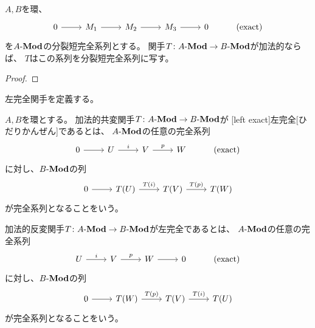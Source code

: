 \documentclass[report]{jlreq}
\begin{document}
\begin{theorem}[加法的関手は分裂短完全列を保つ]
    $A, B$を環、
    \begin{equation}
        \begin{tikzcd}
            0 \ar{r}
                & M_1 \ar{r}
                & M_2 \ar{r}
                & M_3 \ar{r}
                & 0
                & (\text{exact})
        \end{tikzcd}
    \end{equation}
    を$A\text{-}\mathbf{Mod}$の分裂短完全系列とする。
    関手$T \colon A\text{-}\mathbf{Mod} \to B\text{-}\mathbf{Mod}$が加法的ならば、
    $T$はこの系列を分裂短完全系列に写す。
\end{theorem}

\begin{proof}
    \TODO{}
\end{proof}

左完全関手を定義する。

\begin{definition}
    $A, B$を環とする。
    加法的共変関手$T \colon A\text{-}\mathbf{Mod} \to B\text{-}\mathbf{Mod}$が
    [left exact]{左完全}[ひだりかんぜん]であるとは、
    $A\text{-}\mathbf{Mod}$の任意の完全系列
    \begin{equation}
        \begin{tikzcd}
            0 \ar{r}
                & U \ar{r}{i}
                & V \ar{r}{p}
                & W
                & (\text{exact})
        \end{tikzcd}
    \end{equation}
    に対し、$B\text{-}\mathbf{Mod}$の列
    \begin{equation}
        \begin{tikzcd}
            0 \ar{r}
                & T(U) \ar{r}{T(i)}
                & T(V) \ar{r}{T(p)}
                & T(W)
        \end{tikzcd}
    \end{equation}
    が完全系列となることをいう。

    加法的反変関手$T \colon A\text{-}\mathbf{Mod} \to B\text{-}\mathbf{Mod}$が左完全であるとは、
    $A\text{-}\mathbf{Mod}$の任意の完全系列
    \begin{equation}
        \begin{tikzcd}
            U \ar{r}{i}
                & V \ar{r}{p}
                & W \ar{r}
                & 0
                & (\text{exact})
        \end{tikzcd}
    \end{equation}
    に対し、$B\text{-}\mathbf{Mod}$の列
    \begin{equation}
        \begin{tikzcd}
            0 \ar{r}
                & T(W) \ar{r}{T(p)}
                & T(V) \ar{r}{T(i)}
                & T(U)
        \end{tikzcd}
    \end{equation}
    が完全系列となることをいう。
\end{definition}
\end{document}
